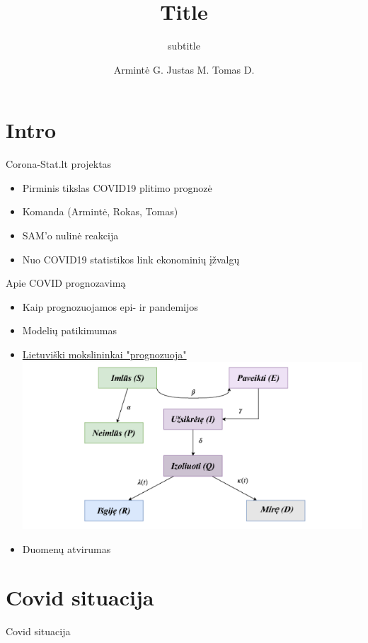 \documentclass[11pt]{beamer}
\author{Armintė G. Justas M. Tomas D.}
\title{Title}
\subtitle{subtitle}
\begin{document}
\begin{frame}
\titlepage
\end{frame}

\begin{frame}
\tableofcontents
\end{frame}

\section{Intro}
\begin{frame}{Corona-Stat.lt projektas}
\begin{itemize}
\item Pirminis tikslas COVID19 plitimo prognozė
\item Komanda (Armintė, Rokas, Tomas)
\item SAM'o nulinė reakcija
\item Nuo COVID19 statistikos link ekonominių įžvalgų
\end{itemize}
\end{frame}


\begin{frame}{Apie COVID prognozavimą}
\begin{itemize}
\item Kaip prognozuojamos epi- ir pandemijos
\item Modelių patikimumas
\item \href{https://mif.vu.lt/lt3/dokumentai/dokumentai/Naujienos/COVID/2020-04-15_SEIR_ilgalakes_prognozes.pdf}{Lietuviški mokslininkai "prognozuoja"}
\includegraphics[scale=0.5]{seiqrdp.png}
\item Duomenų atvirumas  
\end{itemize}
\end{frame}

\section{Covid situacija}
\begin{frame}{Covid situacija}

\end{frame}
\end{document}
